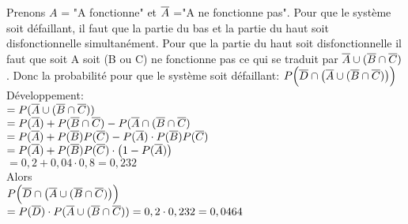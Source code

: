 \begin{exo}
  \begin{flushleft}
    Prenons $A$ = "A fonctionne" et $\overline{A}$ ="A ne fonctionne pas". Pour que le système soit défaillant, il faut que la partie du bas et la partie du haut soit disfonctionnelle simultanément. Pour que la partie du haut soit disfonctionnelle il faut que soit A soit (B ou C) ne fonctionne pas ce qui se traduit par $\overline{A} \cup (\overline{B}\cap \overline{C})$. Donc la probabilité pour que le système soit défaillant: $P\Big(\overline{D}\cap \big( \overline{A} \cup (\overline{B}\cap \overline{C})\big)\Big) $
    \\Développement:
    \\$= P(\overline{A} \cup (\overline{B} \cap \overline{C}))$
    \\$= P(\overline{A}) + P(\overline{B} \cap \overline{C}) - P(\overline{A} \cap (\overline{B} \cap \overline{C})$
    \\$= P(\overline{A}) + P(\overline{B})P(\overline{C}) -  P(\overline{A})\cdot P(\overline{B})P(\overline{C})$
    \\$= P(\overline{A}) + P(\overline{B})P(\overline{C}) \cdot \big(1-P(\overline{A})\big)$
    \\$= 0,2 + 0,04 \cdot 0,8 = 0,232$
    \\ Alors
    \\$P\Big(\overline{D}\cap \big( \overline{A} \cup (\overline{B}\cap \overline{C})\big)\Big) $
    \\$= P(\overline{D})\cdot P(\overline{A} \cup (\overline{B} \cap \overline{C})) = 0,2 \cdot 0,232  = 0,0464$
  \end{flushleft}
\end{exo}
